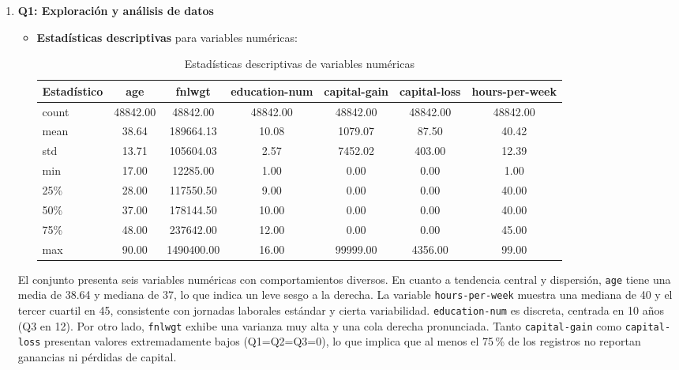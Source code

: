 \documentclass[12pt,a4paper]{article}
\begin{document}
\begin{enumerate}
   \item \textbf{Q1: Exploración y análisis de datos}
    \begin{itemize}
      \item \textbf{Estadísticas descriptivas} para variables numéricas:
      \begin{table}[H]
        \centering
        \small
        \begin{tabular}{@{}l S[table-format=2.2] S[table-format=6.2] S[table-format=2.2] S[table-format=5.2] S[table-format=4.2] S[table-format=2.2]@{}}
          \toprule
          \textbf{Estadístico} & \textbf{age} & \textbf{fnlwgt} & \textbf{education-num} & \textbf{capital-gain} & \textbf{capital-loss} & \textbf{hours-per-week} \\
          \midrule
          count & 48842.00 & 48842.00 & 48842.00 & 48842.00 & 48842.00 & 48842.00 \\
          mean  & 38.64    & 189664.13 & 10.08    & 1079.07  & 87.50    & 40.42 \\
          std   & 13.71    & 105604.03 & 2.57     & 7452.02  & 403.00   & 12.39 \\
          min   & 17.00    & 12285.00  & 1.00     & 0.00     & 0.00     & 1.00 \\
          25\%  & 28.00    & 117550.50 & 9.00     & 0.00     & 0.00     & 40.00 \\
          50\%  & 37.00    & 178144.50 & 10.00    & 0.00     & 0.00     & 40.00 \\
          75\%  & 48.00    & 237642.00 & 12.00    & 0.00     & 0.00     & 45.00 \\
          max   & 90.00    & 1490400.00& 16.00    & 99999.00 & 4356.00  & 99.00 \\
          \bottomrule
        \end{tabular}
        \caption{Estadísticas descriptivas de variables numéricas}
        \label{tab:adult_stats}
      \end{table}
    \end{itemize}

    El conjunto presenta seis variables numéricas con comportamientos diversos. En cuanto a tendencia central y 
    dispersión, \texttt{age} tiene una media de 38.64 y mediana de 37, lo que indica un leve sesgo a la derecha. 
    La variable \texttt{hours-per-week} muestra una mediana de 40 y el tercer cuartil en 45, consistente con jornadas 
    laborales estándar y cierta variabilidad. \texttt{education-num} es discreta, centrada en 10 años (Q3 en 12). 
    Por otro lado, \texttt{fnlwgt} exhibe una varianza muy alta y una cola derecha pronunciada. Tanto \texttt{capital-gain} 
    como \texttt{capital-loss} presentan valores extremadamente bajos (Q1=Q2=Q3=0), lo que implica que al menos el 75\,\% de 
    los registros no reportan ganancias ni pérdidas de capital.


\end{enumerate}
\end{document}
